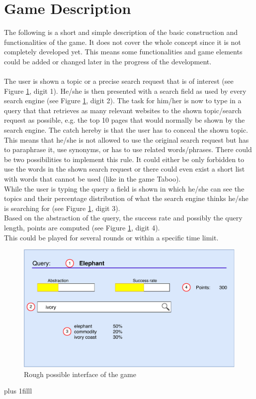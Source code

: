 \documentclass{article}
\theoremstyle{definition}
\theoremstyle{remark}
\newcommand{\btVFill}{\vskip0pt plus 1filll}
\begin{document}
\section{Game Description}
The following is a short and simple description of the basic construction and functionalities of the game. It does not cover the whole concept since it is not completely developed yet. This means some functionalities and game elements could be added or changed later in the progress of the development. \\
\\
The user is shown a topic or a precise search request that is of interest (see Figure \ref{fig:game_interface}, digit 1). He/she is then presented with a search field as used by every search engine (see Figure \ref{fig:game_interface}, digit 2). The task for him/her is now to type in a query that that retrieves as many relevant websites to the shown topic/search request as possible, e.g. the top 10 pages that would normally be shown by the search engine. The catch hereby is that the user has to conceal the shown topic. This means that he/she is not allowed to use the original search request but has to paraphrase it, use synonyms, or has to use related words/phrases. There could be two possibilities to implement this rule. It could either be only forbidden to use the words in the shown search request or there could even exist a short list with words that cannot be used (like in the game Taboo).\\
While the user is typing the query a field is shown in which he/she can see the topics and their percentage distribution of what the search engine thinks he/she is searching for (see Figure \ref{fig:game_interface}, digit 3).\\ 
Based on the abstraction of the query, the success rate and possibly the query length, points are computed (see Figure \ref{fig:game_interface}, digit 4).\\
This could be played for several rounds or within a specific time limit.\\

\begin{figure}[h]
    \includegraphics[width=1.0\textwidth]{images/Game.pdf}
    \caption{Rough possible interface of the game}
    \label{fig:game_interface}
\end{figure}
\btVFill
\end{document}
